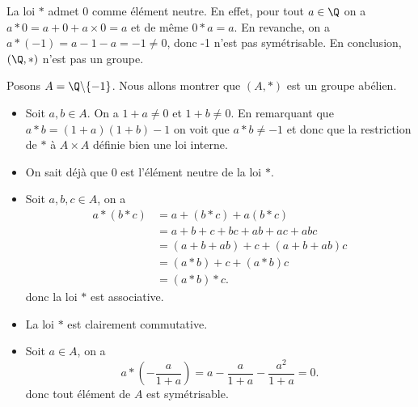 La loi $*$ admet $0$ comme élément neutre. En effet, pour tout $a\in\Q$ on
a $a*0 = a+0+a\times 0 = a$ et de même $0*a = a$. En revanche, on a $a*(-1) =
a-1-a = -1\neq 0$, donc -1 n'est pas symétrisable. En conclusion, $(\Q,*)$
n'est pas un groupe.

\begin{remarque}
Posons $A = \Q\backslash\{-1\}$. Nous allons montrer que $(A,*)$ est un groupe
abélien.

\begin{itemize}
\item Soit $a,b\in A$. On a $1+a \neq 0$ et $1+b \neq 0$. En remarquant que
$a*b = (1+a)(1+b) - 1$ on voit que $a*b \neq -1$ et donc que la restriction de
$*$ à $A \times A$ définie bien une loi interne.

\item On sait déjà que $0$ est l'élément neutre de la loi $*$.

\item Soit $a,b,c\in A$, on a
\begin{align*}
a*(b*c)& = a+(b*c)+a(b*c)\\
       & = a+b+c+bc+ab+ac+abc\\
       & = (a+b+ab)+c+(a+b+ab)c\\
       & = (a*b)+c+(a*b)c\\
       & = (a*b)*c.
\end{align*}
donc la loi $*$ est associative.

\item La loi $*$ est clairement commutative.

\item Soit $a\in A$, on a
\[
  a*\left(-\frac{a}{1+a}\right) = a-\frac{a}{1+a}-\frac{a^2}{1+a} = 0.
\]
donc tout élément de $A$ est symétrisable.

\end{itemize}
\end{remarque}

